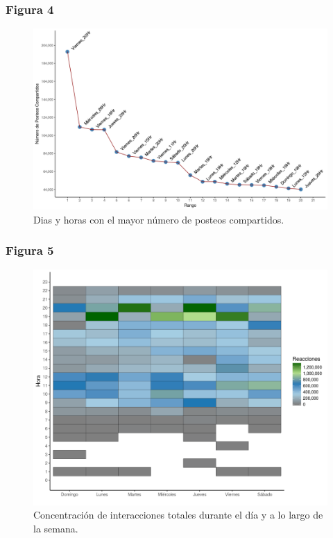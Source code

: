 \documentclass[a4paper,10pt]{article}
\begin{document}
\subsubsection{Figura 4}
\begin{figure}[H]
  \begin{center}
    \includegraphics[width=.85\textwidth]{imagenes/figura4.png}
    \captionsetup{width=.80\textwidth}
    \caption{\centering Dias y horas con el mayor número de posteos compartidos.}   
   \end{center} 
\end{figure}

\subsubsection{Figura 5}
\begin{figure}[H]
  \begin{center}
   \includegraphics[width=.85\textwidth]{imagenes/figura5.png}
   \captionsetup{width=.80\textwidth}
   \caption{\centering Concentración de interacciones totales durante el día y a 
   lo largo de la semana.} 
  \end{center} 
\end{figure}
\end{document}
